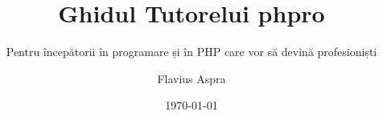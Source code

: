 \documentclass[a4paper,12pt,fleqn,twoside,openright,style=phpro]{yapbook}
\title{Ghidul Tutorelui phpro}
\subtitle{Pentru începătorii în programare și în PHP care vor să devină profesioniști}
\author{Flavius Aspra}
\date{\today}
\begin{document}
\frontmatter

    \maketitle

    \makecopyright

    \tableofcontents

    

\mainmatter

    
    
    
    

\appendix

\backmatter
\end{document}
